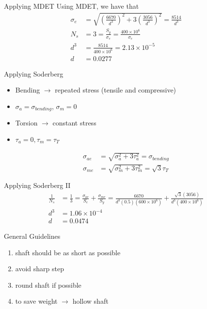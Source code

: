 \documentclass[10pt, svgnames]{beamer}
\begin{document}
\begin{frame}[label={sec:orga3c7bfd}]{Applying MDET}
Using MDET, we have that
\begin{align*}
  \sigma_{e} &= \sqrt{\left(\frac{6670}{d^{3}}\right)^{2} + 3\left(\frac{3056}{d^{3}}\right)^{2}} = \frac{8514}{d^{3}}\\
  N_{s} &= 3 = \frac{S_{y}}{\sigma_{e}} = \frac{400 \times 10^{6}}{\sigma_{e}} \\
  d^{3} &= \frac{8514}{400 \times 10^{6}} = 2.13 \times 10^{-5} \\
  d &= 0.0277
\end{align*}
\end{frame}

\begin{frame}[label={sec:orgc817622}]{Applying Soderberg}
\begin{itemize}
\item Bending \(\rightarrow\) repeated stress (tensile and compressive)
\item \(\sigma_{a} = \sigma_{bending}\), \(\sigma_{m} = 0\)
\item Torsion \(\rightarrow\) constant stress
\item \(\tau_{a} = 0, \tau_{m} = \tau_{T}\)
\end{itemize}


\begin{align*}
  \sigma_{ae} &= \sqrt{\sigma_{a}^{2} + 3\tau_{a}^{2}} = \sigma_{bending} \\
  \sigma_{me} &= \sqrt{\sigma_{m}^{2} + 3\tau_{m}^{2}} = \sqrt{3}\tau_{T}
\end{align*}
\end{frame}

\begin{frame}[label={sec:orgf5b986a}]{Applying Soderberg II}
\begin{align*}
  \frac{1}{N_{s}} &= \frac{1}{3} = \frac{\sigma_{ae}}{S_{e}} + \frac{\sigma_{me}}{S_{y}} = \frac{6670}{d^{3}(0.5)(600 \times 10^{6})} + \frac{\sqrt{3}(3056)}{d^{3}(400 \times 10^{6})}\\
  d^{3} &= 1.06 \times 10^{-4} \\
  d &= 0.0474
\end{align*}
\end{frame}

\begin{frame}[label={sec:org0d4228d}]{General Guidelines}
\begin{enumerate}
\item shaft should be as short as possible
\item avoid sharp step
\item round shaft if possible
\item to save weight \(\rightarrow\) hollow shaft
\end{enumerate}
\end{frame}
\end{document}
